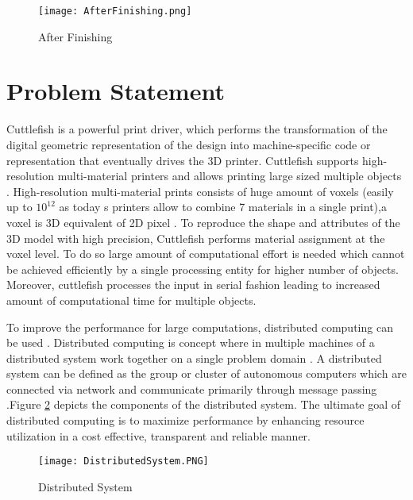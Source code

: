 \begin{figure}[ht!]
\centering
\texttt{[image: AfterFinishing.png]}
\caption{After Finishing}
\label{fig:AfterFinishing}
\end{figure}


\section{Problem Statement}

Cuttlefish \cite{cuttlefish} is a powerful print driver, which performs the transformation of the digital geometric representation of the design into machine-specific code or representation that eventually drives the 3D printer. Cuttlefish supports high-resolution multi-material printers and allows printing large sized multiple objects . High-resolution multi-material prints consists of huge amount of voxels (easily up to \begin{math}10^{12}\end{math} as today \textquotesingle s printers allow to combine 7 materials in a single print),a voxel is 3D equivalent of 2D pixel \cite{3DString}. To reproduce the shape and attributes of the 3D model with high precision, Cuttlefish performs material assignment at the voxel level. To do so large amount of computational effort is needed which cannot be achieved efficiently by a single processing entity for higher number of objects.  Moreover, cuttlefish processes the input in serial fashion leading to increased amount of computational time for multiple objects. \newline

To improve the performance for large computations, distributed computing can be used \cite{DistComp} \cite{Desai}.  Distributed computing is concept where in multiple machines of a distributed system work together on a single problem domain \cite{rouse}.  A distributed system can be defined as the group or cluster of autonomous computers which are connected via network and communicate primarily through message passing \cite{coulouris}.Figure \ref{fig:DS} depicts the components of the distributed system. The ultimate goal of distributed computing is to maximize performance by enhancing resource utilization in a cost effective, transparent and reliable manner.\newline

\begin{figure}[ht!]
\centering
\texttt{[image: DistributedSystem.PNG]}
\caption{Distributed System}
\label{fig:DS}
\end{figure}

